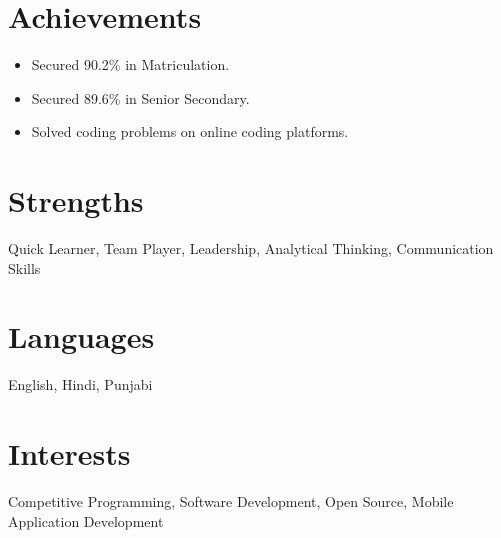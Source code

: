 \documentclass[a4paper,11pt]{article}
\begin{document}

\section*{Achievements}

\begin{itemize}[leftmargin=*]
    \item Secured 90.2\% in Matriculation.
    \item Secured 89.6\% in Senior Secondary.
    \item Solved coding problems on online coding platforms.
\end{itemize}

\section*{Strengths}

Quick Learner, Team Player, Leadership, Analytical Thinking,
Communication Skills

\section*{Languages}

English, Hindi, Punjabi

\section*{Interests}

Competitive Programming, Software Development, Open Source,
Mobile Application Development
\end{document}
